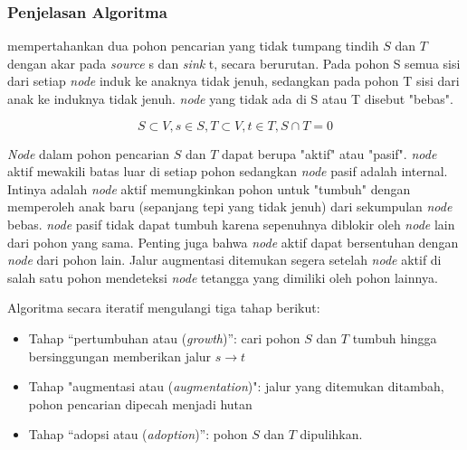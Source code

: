 \subsubsection{Penjelasan Algoritma} 

\cite{Boykov:2004} mempertahankan dua pohon pencarian yang tidak tumpang tindih 
\(S\) dan \(T\) dengan akar pada \emph{source} s dan \emph{sink} t, secara berurutan. 
Pada pohon S semua sisi dari setiap \emph{node} induk ke anaknya tidak jenuh, sedangkan 
pada pohon T sisi dari anak ke induknya tidak jenuh. \emph{node} yang tidak ada di S atau T 
disebut "bebas".

\begin{equation} \label{eq:status_node}
  S \subset V, s \in S, T \subset V, t \in T, S \cap T = 0
\end{equation} 

\emph{Node} dalam pohon pencarian \(S\) dan \(T\) dapat berupa "aktif" atau "pasif". \emph{node} 
aktif mewakili batas luar di setiap pohon sedangkan \emph{node} pasif adalah internal. 
Intinya adalah \emph{node} aktif memungkinkan pohon untuk "tumbuh" dengan memperoleh 
anak baru (sepanjang tepi yang tidak jenuh) dari sekumpulan \emph{node} bebas. 
\emph{node} pasif tidak dapat tumbuh karena sepenuhnya diblokir oleh \emph{node} 
lain dari pohon yang sama. Penting juga bahwa \emph{node} aktif dapat bersentuhan dengan 
\emph{node} dari pohon lain. Jalur augmentasi ditemukan segera setelah \emph{node} aktif 
di salah satu pohon mendeteksi \emph{node} tetangga yang dimiliki oleh pohon lainnya.


Algoritma secara iteratif mengulangi tiga tahap berikut:
\begin{itemize}
    \item Tahap “pertumbuhan atau (\emph{growth})”: cari pohon \(S\) dan \(T\) tumbuh hingga bersinggungan memberikan jalur \(s \rightarrow t\)  
    \item Tahap "augmentasi atau (\emph{augmentation})": jalur yang ditemukan ditambah, pohon pencarian dipecah menjadi hutan
    \item Tahap “adopsi atau (\emph{adoption})”: pohon \(S\) dan \(T\) dipulihkan.
\end{itemize}


